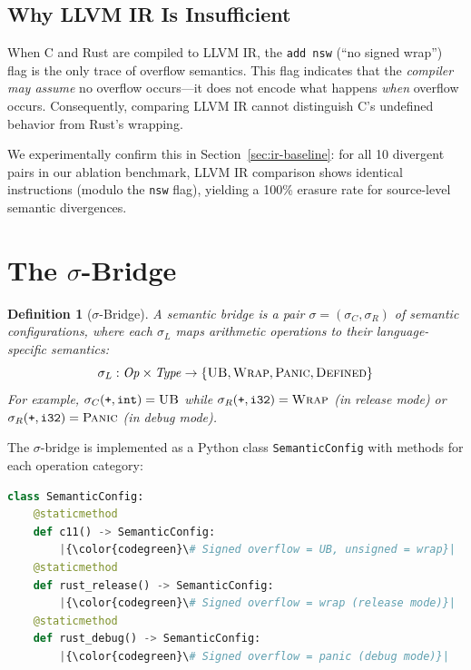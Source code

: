\documentclass[11pt,a4paper]{article}
\newtheorem{definition}[theorem]{Definition}
\begin{document}
\subsection{Why LLVM IR Is Insufficient}

When C and Rust are compiled to LLVM IR, the \texttt{add nsw} (``no signed
wrap'') flag is the only trace of overflow semantics.  This flag indicates
that the \emph{compiler may assume} no overflow occurs---it does not
encode what happens \emph{when} overflow occurs.  Consequently, comparing
LLVM IR cannot distinguish C's undefined behavior from Rust's wrapping.

We experimentally confirm this in Section~\ref{sec:ir-baseline}: for all
10 divergent pairs in our ablation benchmark, LLVM IR comparison shows
identical instructions (modulo the \texttt{nsw} flag), yielding a 100\%
erasure rate for source-level semantic divergences.


\section{The $\sigma$-Bridge}\label{sec:sigma-bridge}

\begin{definition}[$\sigma$-Bridge]\label{def:sigma-bridge}
A \emph{semantic bridge} is a pair $\sigma = (\sigma_C, \sigma_R)$ of
semantic configurations, where each $\sigma_L$ maps arithmetic operations
to their language-specific semantics:
\[
\sigma_L : \mathit{Op} \times \mathit{Type} \to \{\textsc{UB}, \textsc{Wrap}, \textsc{Panic}, \textsc{Defined}\}
\]
For example, $\sigma_{C}(\texttt{+}, \texttt{int}) = \textsc{UB}$ while
$\sigma_{R}(\texttt{+}, \texttt{i32}) = \textsc{Wrap}$ (in release mode)
or $\sigma_{R}(\texttt{+}, \texttt{i32}) = \textsc{Panic}$ (in debug mode).
\end{definition}

The $\sigma$-bridge is implemented as a Python class
\texttt{SemanticConfig} with methods for each operation category:

\begin{lstlisting}[language=Python,escapechar=|]
class SemanticConfig:
    @staticmethod
    def c11() -> SemanticConfig:
        |{\color{codegreen}\# Signed overflow = UB, unsigned = wrap}|
    @staticmethod
    def rust_release() -> SemanticConfig:
        |{\color{codegreen}\# Signed overflow = wrap (release mode)}|
    @staticmethod
    def rust_debug() -> SemanticConfig:
        |{\color{codegreen}\# Signed overflow = panic (debug mode)}|
\end{lstlisting}
\end{document}
